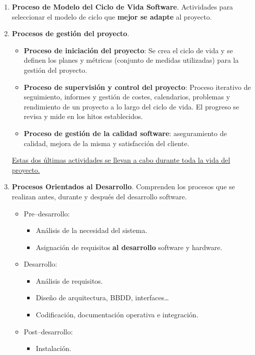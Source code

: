 \begin{enumerate}
    \item \textbf{Proceso de Modelo del Ciclo de Vida Software}.  Actividades para seleccionar el modelo de ciclo que \textbf{mejor se adapte} al proyecto.
    \item \textbf{Procesos de gestión del proyecto}.
    \begin{itemize}
        \item \textbf{Proceso de iniciación del proyecto}: Se crea el ciclo de vida y se definen los planes y métricas (conjunto de medidas utilizadas) para la gestión del proyecto.
        \item \textbf{Proceso de supervisión y control del proyecto}: Proceso iterativo de seguimiento, informes y gestión de costes, calendarios, problemas y rendimiento de un proyecto a lo largo del ciclo de vida. El progreso se revisa y mide en los hitos establecidos.
        \item \textbf{Proceso de gestión de la calidad software}: aseguramiento de calidad, mejora de la misma y satisfacción del cliente.
    \end{itemize}
    \uline{Estas dos últimas actividades se llevan a cabo durante toda la vida del proyecto.}
    \item \textbf{Procesos Orientados al Desarrollo}. Comprenden los procesos que se realizan antes, durante y después del desarrollo software.
    \begin{itemize}
        \item Pre--desarrollo:
        \begin{itemize}
            \item Análisis de la necesidad del sistema.
            \item Asignación de requisitos \textbf{al desarrollo} software y hardware.
        \end{itemize}
        \item Desarrollo:
        \begin{itemize}
            \item Análisis de requisitos.
            \item Diseño de arquitectura, BBDD, interfaces\ldots
            \item Codificación, documentación operativa e integración.
        \end{itemize}
        \item Post--desarrollo:
        \begin{itemize}
            \item Instalación.

\end{itemize}
\end{itemize}
\end{enumerate}
